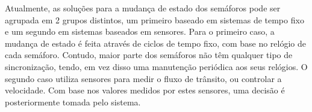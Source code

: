     Atualmente, as soluções para a mudança de estado dos semáforos pode ser agrupada em 2 grupos distintos, um primeiro baseado em sistemas de tempo fixo e um segundo em sistemas baseados em sensores. Para o primeiro caso, a mudança de estado é feita através de ciclos de tempo fixo, com base no relógio de cada semáforo. Contudo, maior parte dos semáforos não têm qualquer tipo de sincronização, tendo, em vez disso uma manutenção periódica aos seus relógios. O segundo caso utiliza sensores para medir o fluxo de trânsito, ou controlar a velocidade. Com base nos valores medidos por estes sensores, uma decisão é posteriormente tomada pelo sistema.
    
    